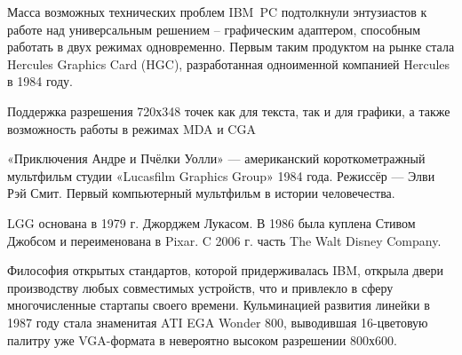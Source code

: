 \documentclass[10pt]{beamer}
\begin{document}



{
	\small 
	
	Масса возможных технических проблем IBM~PC подтолкнули энтузиастов к работе над универсальным решением – графическим адаптером, способным работать в двух режимах одновременно. Первым таким продуктом на рынке стала Hercules Graphics Card (HGC), разработанная одноименной компанией Hercules в 1984 году.
	
	{
	}
	{
		Поддержка разрешения 720х348 точек как для текста, так и для графики, а также возможность работы в режимах MDA и CGA
	}
	
	
		
}

{
	{
	}
	{
		«Приключения Андре и Пчёлки Уолли»  — американский короткометражный мультфильм студии «Lucasfilm Graphics Group» 1984 года. Режиссёр — Элви Рэй Смит.	Первый компьютерный мультфильм в истории человечества.
		
		\hfill
		
	 	\footnotesize {}
	 	
	 	\hfill
	 	
		 \footnotesize	LGG основана в 1979 г. Джорджем Лукасом. В 1986 была куплена Стивом Джобсом и переименована в Pixar. C 2006 г. часть  The Walt Disney Company.
		 
		 
	}	
	

}


{
	Философия открытых стандартов, которой придерживалась IBM, открыла двери производству любых совместимых устройств, что и привлекло в сферу многочисленные стартапы своего времени.
	{
	}
	{
		Кульминацией развития линейки в 1987 году стала знаменитая ATI EGA Wonder 800, выводившая 16-цветовую палитру уже VGA-формата в невероятно высоком разрешении 800х600. 
	}
}
\end{document}
